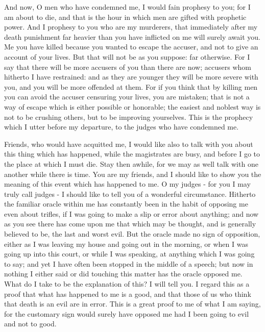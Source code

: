 \documentclass[11pt]{article}
\begin{document}
And now, O men who have condemned me, I would fain prophesy to you; for I am about to die, and that is the hour in which men are gifted with prophetic power. And I prophesy to you who are my murderers, that immediately after my death punishment far heavier than you have inflicted on me will surely await you. Me you have killed because you wanted to escape the accuser, and not to give an account of your lives. But that will not be as you suppose: far otherwise. For I say that there will be more accusers of you than there are now; accusers whom hitherto I have restrained: and as they are younger they will be more severe with you, and you will be more offended at them. For if you think that by killing men you can avoid the accuser censuring your lives, you are mistaken; that is not a way of escape which is either possible or honorable; the easiest and noblest way is not to be crushing others, but to be improving yourselves. This is the prophecy which I utter before my departure, to the judges who have condemned me.

Friends, who would have acquitted me, I would like also to talk with you about this thing which has happened, while the magistrates are busy, and before I go to the place at which I must die. Stay then awhile, for we may as well talk with one another while there is time. You are my friends, and I should like to show you the meaning of this event which has happened to me. O my judges - for you I may truly call judges - I should like to tell you of a wonderful circumstance. Hitherto the familiar oracle within me has constantly been in the habit of opposing me even about trifles, if I was going to make a slip or error about anything; and now as you see there has come upon me that which may be thought, and is generally believed to be, the last and worst evil. But the oracle made no sign of opposition, either as I was leaving my house and going out in the morning, or when I was going up into this court, or while I was speaking, at anything which I was going to say; and yet I have often been stopped in the middle of a speech; but now in nothing I either said or did touching this matter has the oracle opposed me. What do I take to be the explanation of this? I will tell you. I regard this as a proof that what has happened to me is a good, and that those of us who think that death is an evil are in error. This is a great proof to me of what I am saying, for the customary sign would surely have opposed me had I been going to evil and not to good.
\end{document}
